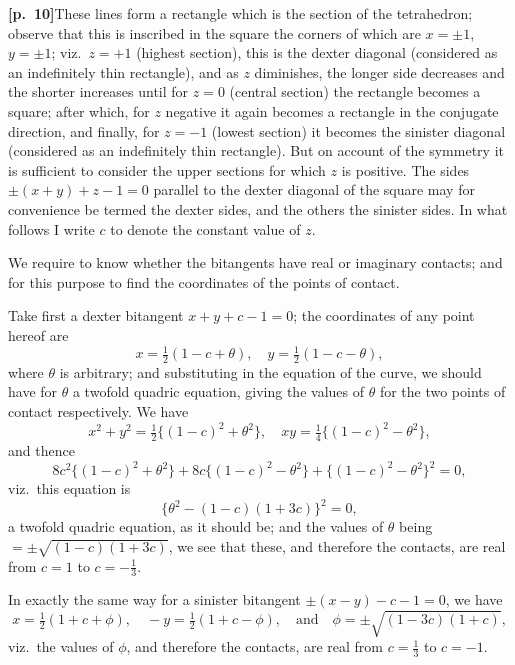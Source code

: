 \documentclass[11pt,a4paper]{article}
\begin{document}
\noindent\textbf{[p.~10]}\quad These lines form a rectangle which is the section of the tetrahedron; observe that this is inscribed in the square the corners of which are $x = \pm 1$, $y = \pm 1$; viz.\ $z = +1$ (highest section), this is the dexter diagonal (considered as an indefinitely thin rectangle), and as $z$ diminishes, the longer side decreases and the shorter increases until for $z = 0$ (central section) the rectangle becomes a square; after which, for $z$ negative it again becomes a rectangle in the conjugate direction, and finally, for $z = -1$ (lowest section) it becomes the sinister diagonal (considered as an indefinitely thin rectangle). But on account of the symmetry it is sufficient to consider the upper sections for which $z$ is positive. The sides $\pm(x + y) + z - 1 = 0$ parallel to the dexter diagonal of the square may for convenience be termed the dexter sides, and the others the sinister sides. In what follows I write $c$ to denote the constant value of $z$.

\medskip

We require to know whether the bitangents have real or imaginary contacts; and for this purpose to find the coordinates of the points of contact.

\medskip

Take first a dexter bitangent $x + y + c - 1 = 0$; the coordinates of any point hereof are
\[
x = \tfrac{1}{2}(1 - c + \theta), \quad y = \tfrac{1}{2}(1 - c - \theta),
\]
where $\theta$ is arbitrary; and substituting in the equation of the curve, we should have for $\theta$ a twofold quadric equation, giving the values of $\theta$ for the two points of contact respectively. We have
\[
x^{2} + y^{2} = \tfrac{1}{2}\{(1 - c)^{2} + \theta^{2}\}, \quad xy = \tfrac{1}{4}\{(1 - c)^{2} - \theta^{2}\},
\]
and thence
\[
8c^{2}\{(1 - c)^{2} + \theta^{2}\} + 8c\{(1 - c)^{2} - \theta^{2}\} + \{(1 - c)^{2} - \theta^{2}\}^{2} = 0,
\]
viz.\ this equation is
\[
\{\theta^{2} - (1 - c)(1 + 3c)\}^{2} = 0,
\]
a twofold quadric equation, as it should be; and the values of $\theta$ being $= \pm\sqrt{(1-c)(1+3c)}$, we see that these, and therefore the contacts, are real from $c = 1$ to $c = -\tfrac{1}{3}$.

\medskip

In exactly the same way for a sinister bitangent $\pm(x - y) - c - 1 = 0$, we have
\[
x = \tfrac{1}{2}(1 + c + \phi), \quad -y = \tfrac{1}{2}(1 + c - \phi), \quad \text{and} \quad \phi = \pm\sqrt{(1 - 3c)(1 + c)},
\]
viz.\ the values of $\phi$, and therefore the contacts, are real from $c = \tfrac{1}{3}$ to $c = -1$.
\end{document}
